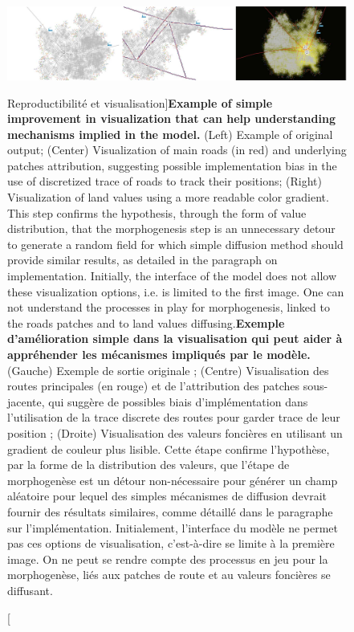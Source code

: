 \begin{figure}
\includegraphics[width=\linewidth]{Figures/Final/3-1-3-fig-reproducibility-tijuana.jpg}
\caption[Reproducibility and visualization][Reproductibilité et visualisation]{\textbf{Example of simple improvement in visualization that can help understanding mechanisms implied in the model.} (Left) Example of original output; (Center) Visualization of main roads (in red) and underlying patches attribution, suggesting possible implementation bias in the use of discretized trace of roads to track their positions; (Right) Visualization of land values using a more readable color gradient. This step confirms the hypothesis, through the form of value distribution, that the morphogenesis step is an unnecessary detour to generate a random field for which simple diffusion method should provide similar results, as detailed in the paragraph on implementation. Initially, the interface of the model does not allow these visualization options, i.e. is limited to the first image. One can not understand the processes in play for morphogenesis, linked to the roads patches and to land values diffusing.\label{fig:reproducibility:tijuana}}{\textbf{Exemple d'amélioration simple dans la visualisation qui peut aider à appréhender les mécanismes impliqués par le modèle.} (Gauche) Exemple de sortie originale ; (Centre) Visualisation des routes principales (en rouge) et de l'attribution des patches sous-jacente, qui suggère de possibles biais d'implémentation dans l'utilisation de la trace discrete des routes pour garder trace de leur position ; (Droite) Visualisation des valeurs foncières en utilisant un gradient de couleur plus lisible. Cette étape confirme l'hypothèse, par la forme de la distribution des valeurs, que l'étape de morphogenèse est un détour non-nécessaire pour générer un champ aléatoire pour lequel des simples mécanismes de diffusion devrait fournir des résultats similaires, comme détaillé dans le paragraphe sur l'implémentation. Initialement, l'interface du modèle ne permet pas ces options de visualisation, c'est-à-dire se limite à la première image. On ne peut se rendre compte des processus en jeu pour la morphogenèse, liés aux patches de route et au valeurs foncières se diffusant.\label{fig:reproducibility:tijuana}}
\end{figure}



